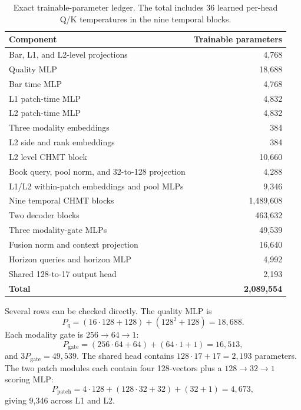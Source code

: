 \documentclass[10pt,letterpaper]{article}
\numberwithin{equation}{section}
\theoremstyle{definition}
\theoremstyle{remark}
\begin{document}
\begin{table}[H]
\centering
\small
\begin{tabular}{@{}lr@{}}
\toprule
\textbf{Component} & \textbf{Trainable parameters}\\
\midrule
Bar, L1, and L2-level projections & 4,768\\
Quality MLP & 18,688\\
Bar time MLP & 4,768\\
L1 patch-time MLP & 4,832\\
L2 patch-time MLP & 4,832\\
Three modality embeddings & 384\\
L2 side and rank embeddings & 384\\
L2 level CHMT block & 10,660\\
Book query, pool norm, and 32-to-128 projection & 4,288\\
L1/L2 within-patch embeddings and pool MLPs & 9,346\\
Nine temporal CHMT blocks & 1,489,608\\
Two decoder blocks & 463,632\\
Three modality-gate MLPs & 49,539\\
Fusion norm and context projection & 16,640\\
Horizon queries and horizon MLP & 4,992\\
Shared 128-to-17 output head & 2,193\\
\midrule
\textbf{Total} & \textbf{2,089,554}\\
\bottomrule
\end{tabular}
\caption{Exact trainable-parameter ledger. The total includes 36 learned
per-head Q/K temperatures in the nine temporal blocks.}
\label{tab:parameter-ledger}
\end{table}

Several rows can be checked directly. The quality MLP is
\begin{equation}
P_{q}=(16\cdot128+128)+(128^2+128)=18{,}688.
\label{eq:quality-params}
\end{equation}
Each modality gate is $256\rightarrow64\rightarrow1$:
\begin{equation}
P_{\mathrm{gate}}=(256\cdot64+64)+(64\cdot1+1)=16{,}513,
\label{eq:gate-params}
\end{equation}
and $3P_{\mathrm{gate}}=49{,}539$. The shared head contains
$128\cdot17+17=2{,}193$ parameters. The two patch modules each contain four
128-vectors plus a $128\rightarrow32\rightarrow1$ scoring MLP:
\begin{equation}
P_{\mathrm{patch}}=4\cdot128+(128\cdot32+32)+(32+1)=4{,}673,
\label{eq:patch-params}
\end{equation}
giving 9,346 across L1 and L2.
\end{document}
